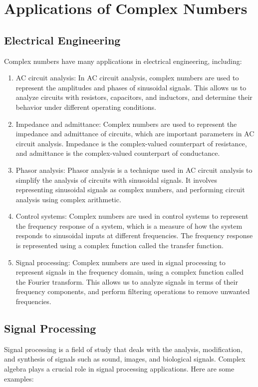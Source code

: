 \documentclass{article}
\begin{document}
\section{Applications of Complex Numbers}
\subsection{Electrical Engineering}
Complex numbers have many applications in electrical engineering, including:

\begin{enumerate}
\item AC circuit analysis: In AC circuit analysis, complex numbers are used to represent the amplitudes and phases of sinusoidal signals. This allows us to analyze circuits with resistors, capacitors, and inductors, and determine their behavior under different operating conditions.
\item Impedance and admittance: Complex numbers are used to represent the impedance and admittance of circuits, which are important parameters in AC circuit analysis. Impedance is the complex-valued counterpart of resistance, and admittance is the complex-valued counterpart of conductance.
\item Phasor analysis: Phasor analysis is a technique used in AC circuit analysis to simplify the analysis of circuits with sinusoidal signals. It involves representing sinusoidal signals as complex numbers, and performing circuit analysis using complex arithmetic.
\item Control systems: Complex numbers are used in control systems to represent the frequency response of a system, which is a measure of how the system responds to sinusoidal inputs at different frequencies. The frequency response is represented using a complex function called the transfer function.
\item Signal processing: Complex numbers are used in signal processing to represent signals in the frequency domain, using a complex function called the Fourier transform. This allows us to analyze signals in terms of their frequency components, and perform filtering operations to remove unwanted frequencies.
\end{enumerate}


\subsection{Signal Processing}
Signal processing is a field of study that deals with the analysis, modification, and synthesis of signals such as sound, images, and biological signals. Complex algebra plays a crucial role in signal processing applications. Here are some examples:
\end{document}
